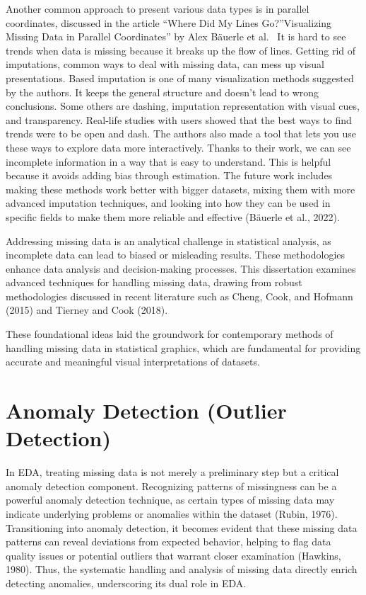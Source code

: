 \documentclass[print]{nuthesis}
\begin{document}
Another common approach to present various data types is in parallel coordinates, discussed in the article ``Where Did My Lines Go?''Visualizing Missing Data in Parallel Coordinates'' by Alex Bäuerle et al.~
It is hard to see trends when data is missing because it breaks up the flow of lines. Getting rid of imputations, common ways to deal with missing data, can mess up visual presentations. Based imputation is one of many visualization methods suggested by the authors.
It keeps the general structure and doesn't lead to wrong conclusions.
Some others are dashing, imputation representation with visual cues, and transparency. Real-life studies with users showed that the best ways to find trends were to be open and dash.
The authors also made a tool that lets you use these ways to explore data more interactively. Thanks to their work, we can see incomplete information in a way that is easy to understand.
This is helpful because it avoids adding bias through estimation.
The future work includes making these methods work better with bigger datasets, mixing them with more advanced imputation techniques, and looking into how they can be used in specific fields to make them more reliable and effective (Bäuerle et al., 2022).

Addressing missing data is an analytical challenge in statistical analysis, as incomplete data can lead to biased or misleading results. These methodologies enhance data analysis and decision-making processes.
This dissertation examines advanced techniques for handling missing data, drawing from robust methodologies discussed in recent literature such as Cheng, Cook, and Hofmann (2015) and Tierney and Cook (2018).

These foundational ideas laid the groundwork for contemporary methods of handling missing data in statistical graphics, which are fundamental for providing accurate and meaningful visual interpretations of datasets.

\hypertarget{anomaly-detection-outlier-detection}{%
\section{Anomaly Detection (Outlier Detection)}\label{anomaly-detection-outlier-detection}}

In EDA, treating missing data is not merely a preliminary step but a critical anomaly detection component.
Recognizing patterns of missingness can be a powerful anomaly detection technique, as certain types of missing data may indicate underlying problems or anomalies within the dataset (Rubin, 1976).
Transitioning into anomaly detection, it becomes evident that these missing data patterns can reveal deviations from expected behavior, helping to flag data quality issues or potential outliers that warrant closer examination (Hawkins, 1980).
Thus, the systematic handling and analysis of missing data directly enrich detecting anomalies, underscoring its dual role in EDA.
\end{document}

